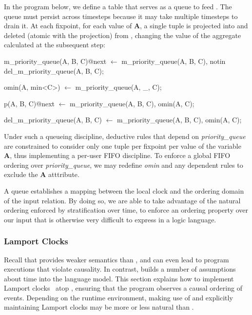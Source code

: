 In the program below, we define a table  that
serves as a queue to feed .  The queue must persist
across timesteps because it may take multiple timesteps to drain it.  At each
fixpoint, for each value of \textbf{A}, a single tuple is projected into
 and deleted (atomic with the projection) from
, changing the value of the aggregate calculated
at the subsequent step:

\begin{Dedalus}

m\_priority\_queue(A, B, C)@next \(\leftarrow\)
  m\_priority\_queue(A, B, C),
  notin del\_m\_priority\_queue(A, B, C);

omin(A, min<C>) \(\leftarrow\)
  m\_priority\_queue(A, _, C);

p(A, B, C)@next \(\leftarrow\)
  m\_priority\_queue(A, B, C),
  omin(A, C);

del\_m\_priority\_queue(A, B, C) \(\leftarrow\)
  m\_priority\_queue(A, B, C),
  omin(A, C);
\end{Dedalus}

Under such a queueing discipline, deductive rules that depend on
\emph{priority\_queue} are constrained to consider only one tuple per fixpoint
per value of the variable \textbf{A}, thus implementing a per-user FIFO
discipline.  To enforce a global FIFO ordering over \emph{priority\_queue}, we
may redefine \emph{omin} and any dependent rules to exclude the \textbf{A}
atttribute.

A queue establishes a mapping between the local clock and the ordering domain of the input relation. By doing so, we are able to take
advantage of the natural ordering enforced by stratification over time, to enforce an ordering property over our input that is otherwise 
very difficult to express in a logic language.

\subsubsection{Lamport Clocks}
Recall that  provides weaker semantics than
, and can even lead to program executions that violate
causality.  In contrast,  builds a number of
assumptions about time into the language model.  This section explains
how to implement Lamport clocks~\cite{timeclocks} atop
, ensuring that the program observes a causal ordering
of events.  Depending on the runtime environment, making use of
 and explicitly maintaining Lamport clocks may be more
or less natural than .

